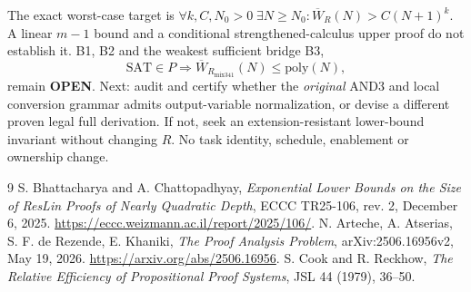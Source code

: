 \documentclass[11pt]{article}
\begin{document}
The exact worst-case target is $\forall k,C,N_0>0\;\exists N\ge N_0:\overline W_R(N)>C(N+1)^k$. A linear $m-1$ bound and a conditional strengthened-calculus upper proof do not establish it. B1, B2 and the weakest sufficient bridge B3,
\[
\mathrm{SAT}\in P\Longrightarrow \overline W_{R_{\mathrm{mix341}}}(N)\le\mathrm{poly}(N),
\]
remain \textbf{OPEN}. Next: audit and certify whether the \emph{original} AND3 and local conversion grammar admits output-variable normalization, or devise a different proven legal full derivation. If not, seek an extension-resistant lower-bound invariant without changing $R$. No task identity, schedule, enablement or ownership change.

\begin{thebibliography}{9}
 S. Bhattacharya and A. Chattopadhyay, \emph{Exponential Lower Bounds on the Size of ResLin Proofs of Nearly Quadratic Depth}, ECCC TR25-106, rev. 2, December 6, 2025. \url{https://eccc.weizmann.ac.il/report/2025/106/}.
 N. Arteche, A. Atserias, S. F. de Rezende, E. Khaniki, \emph{The Proof Analysis Problem}, arXiv:2506.16956v2, May 19, 2026. \url{https://arxiv.org/abs/2506.16956}.
 S. Cook and R. Reckhow, \emph{The Relative Efficiency of Propositional Proof Systems}, JSL 44 (1979), 36--50.
\end{thebibliography}
\end{document}
